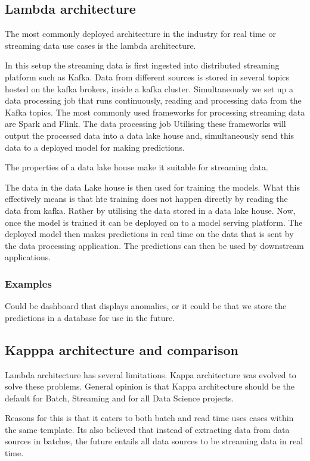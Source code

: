 \subsection{Lambda architecture}
The most commonly deployed architecture in the industry for real time or streaming data use cases is the lambda architecture.

In this setup the streaming data is first ingested into distributed streaming platform such as Kafka.
Data from different sources is stored in several topics hosted on the kafka brokers, inside a kafka cluster.
Simultaneously we set up a data processing job that runs continuously, reading and processing data from the Kafka topics.
The most commonly used frameworks for processing streaming data are Spark and Flink.
The data processing job Utilising these frameworks will output the processed data into a data lake house and, simultaneously send this data to a deployed model for making predictions.

\begin{note}
    The properties of a data lake house make it suitable for streaming data.
\end{note}

The data in the data Lake house is then used for training the models.
What this effectively means is that hte training does not happen directly by reading the data from kafka.
Rather by utilising the data stored in a data lake house.
Now, once the model is trained it can be deployed on to a model serving platform.
The deployed model then makes predictions in real time on the data that is sent by the data processing application.
The predictions can then be used by downstream applications.

\subsubsection{Examples}
Could be dashboard that displays anomalies, or it could be that we store the predictions in a database for use in the future.

\subsection{Kapppa architecture and comparison}
Lambda architecture has several limitations.
Kappa architecture was evolved to solve these problems.
General opinion is that Kappa architecture should be the default for Batch, Streaming and for all Data Science projects.

Reasons for this is that it caters to both batch and read time uses cases within the same template.
Its also believed that instead of extracting data from data sources in batches, the future entails all data sources to be streaming data in real time.

